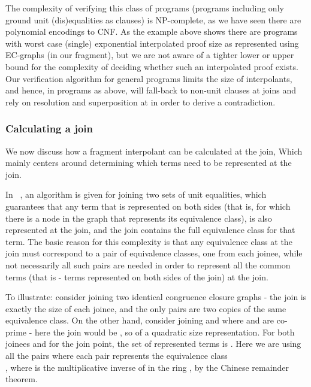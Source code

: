 The complexity of verifying this class of programs (programs including only ground unit (dis)equalities as clauses) is NP-complete, as we have seen there are polynomial encodings to CNF.
As the example above shows there are programs with worst case (single) exponential interpolated proof size as represented using EC-graphs (in our fragment), but we are not aware of a tighter lower or upper bound for the complexity of deciding whether such an interpolated proof exists. Our verification algorithm for general programs limits the size of interpolants, and hence, in programs as above, 
will fall-back to non-unit clauses at joins and rely on resolution and superposition at  in order to derive a contradiction.

\subsubsection*{Calculating a join}
We now discuss how a fragment interpolant can be calculated at the join, Which mainly centers around determining which terms need to be represented at the join.

In ~\cite{GulwaniTiwariNecula04}, an  algorithm is given for joining two sets of unit equalities, which guarantees that any term that is represented on both sides (that is, for which there is a node in the graph that represents its equivalence class), is also represented at the join, and the join contains the full equivalence class for that term.
The basic reason for this complexity is that any equivalence class at the join must correspond to a pair of equivalence classes, one from each joinee, while not necessarily all such pairs are needed in order to represent all the common terms (that is - terms represented on both sides of the join) at the join.

To illustrate: consider joining two identical congruence closure graphs - the join is exactly the size of each joinee, and the only pairs are two copies of the same equivalence class.
On the other hand, consider joining   and  where  and  are co-prime - here the join would be , so of a quadratic size representation. 
For both joinees and for the join point, the set of represented terms is .
Here we are using all the pairs where each pair  represents the equivalence class \\
, 
where  is the multiplicative inverse of  in the ring , by the Chinese remainder theorem.

